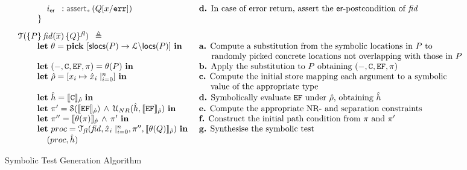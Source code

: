 \begin{figure}
{$$\begin{array}{ll}
             \dspc \dspc \dspc \procerrlab \, \, \, : \sepassert(Q[\jvar/\procerrvar])
                  & \text{  {\bf d.}  In case of error return,  assert the $\ferror$-postcondition of $\fid$} \\ 
         \ \ \ \ \ \ \ \} \\[8pt]
%         
\testify{}(\specsig{P}{\fid(\jvec{x})}{Q}{\flag}) \ \semeq & \\      
    \dspc \dspc  \mathbf{let} \ \subst = \mathbf{pick} \ \functionset{\aslocs(P)}{\locs \backslash \eflocs(P)} \ \mathbf{in} 
           & \text{  {\bf a.}  Compute a substitution from the symbolic locations in $P$ to} \\ 
           & \text{ $\phantom{a.}\ $ randomly picked concrete locations not overlapping with those in $P$}  \\
    \dspc \dspc  \mathbf{let} \ (-, \cells, \efs, \pc) = \subst(P) \ \mathbf{in}  
            & \text{  {\bf b.}  Apply the substitution to $P$ obtaining $(-, \cells, \efs, \pc)$}  \\
    \dspc \dspc  \mathbf{let} \ \sstore = [ \jvar_i \mapsto \svar_i \mid_{i=0}^n] \ \mathbf{in} 
            & \text{  {\bf c.} Compute the initial store mapping each argument to a symbolic}  \\
            & \text{ $\phantom{c.} \ $  value of the appropriate type}  \\
    \dspc \dspc  \mathbf{let} \ \sheap = \symbeval{\cells}{\sstore} \ \mathbf{in} 
           & \text{  {\bf d.}  Symbolically evaluate $\efs$ under $\sstore$, obtaining $\sheap$}  \\
    \dspc \dspc  \mathbf{let} \ \pc' = \sanity{\symbeval{\efs}{\sstore}} \, \wedge \,  \unificationef{\sheap}{\symbeval{\efs}{\sstore}}  \ \mathbf{in} 
           & \text{  {\bf e.}  Compute the appropriate NR- and separation constraints}  \\
      \dspc \dspc  \mathbf{let} \ \pc'' = \symbeval{\subst(\pc)}{\sstore} \, \wedge \, \pc'  \ \mathbf{in} 
          & \text{  {\bf f.} Construct the initial path condition from $\pc$ and $\pc'$}  \\
       \dspc \dspc  \mathbf{let} \ \proc = \testify{\flag}(\fid, \svar_i\mid_{i=0}^n, \pc'', \symbeval{\subst(Q)}{\sstore})  \ \mathbf{in} 
          & \text{  {\bf g.} Synthesise the symbolic test} \\
      \dspc \dspc \dspc (\proc, \sheap) 
\end{array}
$$}
\caption{Symbolic Test Generation Algorithm~\label{fig:test:generation}}
\end{figure}


